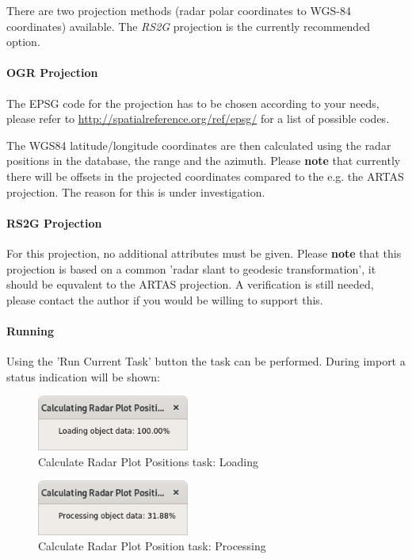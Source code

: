 There are two projection methods (radar polar coordinates to WGS-84 coordinates) available. The \textit{RS2G} projection is the currently recommended option.

\paragraph{OGR Projection}

The EPSG code for the projection has to be chosen according to your needs, please refer to \url{http://spatialreference.org/ref/epsg/} for a list of possible codes.

The WGS84 latitude/longitude coordinates are then calculated using the radar positions in the database, the range and the azimuth. Please \textbf{note} that currently there will be offsets in the projected coordinates compared to the e.g. the ARTAS projection. The reason for this is under investigation.

\paragraph{RS2G Projection}

For this projection, no additional attributes must be given. Please \textbf{note} that this projection is based on a common 'radar slant to geodesic transformation', it should be equvalent to the ARTAS projection. A verification is still needed, please contact the author if you would be willing to support this.

\paragraph{Running}

Using the 'Run Current Task' button the task can be performed. During import a status indication will be shown:

\begin{figure}[H]
  \center
    \includegraphics[width=5cm]{figures/task_calc_radar_load.png}
  \caption{Calculate Radar Plot Positions task: Loading}
\end{figure}

\begin{figure}[H]
  \center
    \includegraphics[width=5cm]{figures/task_calc_radar_process.png}
  \caption{Calculate Radar Plot Position task: Processing}
\end{figure}

